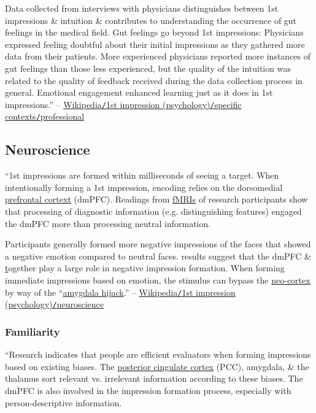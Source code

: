 \documentclass[oneside]{book}
\numberwithin{equation}{section}
\begin{document}
Data collected from interviews with physicians distinguishes between 1st impressions \& intuition \& contributes to understanding the occurrence of gut feelings in the medical field. Gut feelings go beyond 1st impressions: Physicians expressed feeling doubtful about their initial impressions as they gathered more data from their patients. More experienced physicians reported more instances of gut feelings than those less experienced, but the quality of the intuition was related to the quality of feedback received during the data collection process in general. Emotional engagement enhanced learning just as it does in 1st impressions.'' -- \href{https://en.wikipedia.org/wiki/First_impression_(psychology)#Professional}{Wikipedia\texttt{/}1st impression (psychology)\texttt{/}specific contexts\texttt{/}professional}

\subsection{Neuroscience}
``1st impressions are formed within milliseconds of seeing a target. When intentionally forming a 1st impression, encoding relies on the dorsomedial \href{https://en.wikipedia.org/wiki/Prefrontal_cortex}{prefrontal cortext} (dmPFC). Readings from \href{https://en.wikipedia.org/wiki/FMRI}{fMRIs} of research participants show that processing of diagnostic information (e.g. distinguishing features) engaged the dmPFC more than processing neutral information.

Participants generally formed more negative impressions of the faces that showed a negative emotion compared to neutral faces. results suggest that the dmPFC \& \href{https://en.wikipedia.org/wiki/Amygdala} together play a large role in negative impression formation. When forming immediate impressions based on emotion, the stimulus can bypass the \href{https://en.wikipedia.org/wiki/Neo-cortex}{neo-cortex} by way of the ``\href{https://en.wikipedia.org/wiki/Amygdala_hijack}{amygdala hijack}.'' -- \href{https://en.wikipedia.org/wiki/First_impression_(psychology)#Neuroscience}{Wikipedia\texttt{/}1st impression (psychology)\texttt{/}neuroscience}

\subsubsection{Familiarity}
``Research indicates that people are efficient evaluators when forming impressions based on existing biases. The \href{https://en.wikipedia.org/wiki/Posterior_cingulate_cortex}{posterior cingulate cortex} (PCC), amygdala, \& the thalamus sort relevant vs. irrelevant information according to these biases. The dmPFC is also involved in the impression formation process, especially with person-descriptive information.
\end{document}
